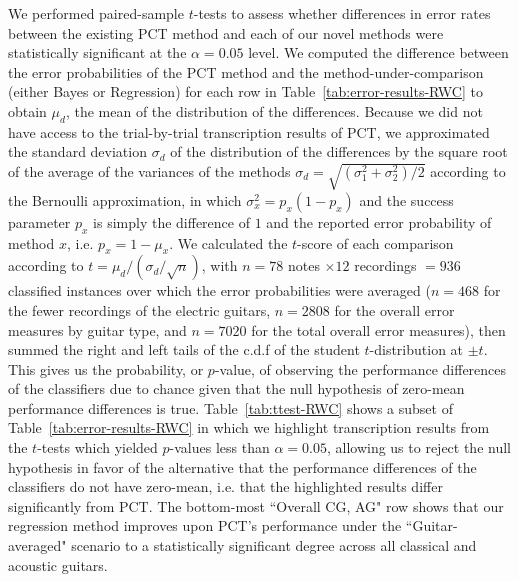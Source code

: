 \documentclass[12pt]{cmuthesis}
\begin{document}
We performed paired-sample $t$-tests to assess whether differences in error rates between the existing PCT method and each of our novel methods were statistically significant at the $\alpha = 0.05$ level. We computed the difference between the error probabilities of the PCT method and the method-under-comparison (either Bayes or Regression) for each row in Table~\ref{tab:error-results-RWC} to obtain $\mu_d$, the mean of the distribution of the differences. Because we did not have access to the trial-by-trial transcription results of PCT, we approximated the standard deviation $\sigma_d$ of the distribution of the differences by the square root of the average of the variances of the methods $\sigma_d = \sqrt{(\sigma^2_1+\sigma^2_2)/2}$ according to the Bernoulli approximation, in which $\sigma_x^2 = p_x(1-p_x)$ and the success parameter $p_x$ is simply the difference of $1$ and the reported error probability of method $x$, i.e. $p_x = 1-\mu_x$. We calculated the $t$-score of each comparison according to $t = \mu_d/(\sigma_d/\sqrt{n})$, with $n= 78$ notes $\times 12$ recordings $=936$ classified instances over which the error probabilities were averaged ($n=468$ for the fewer recordings of the electric guitars, $n=2808$ for the overall error measures by guitar type, and $n=7020$ for the total overall error measures), then summed the right and left tails of the c.d.f of the student $t$-distribution at $\pm t$. This gives us the probability, or $p$-value, of observing the performance differences of the classifiers due to chance given that the null hypothesis of zero-mean performance differences is true. Table~\ref{tab:ttest-RWC} shows a subset of Table~\ref{tab:error-results-RWC} in which we highlight transcription results from the $t$-tests which yielded $p$-values less than $\alpha = 0.05$, allowing us to reject the null hypothesis in favor of the alternative that the performance differences of the classifiers do not have zero-mean, i.e. that the highlighted results differ significantly from PCT. The bottom-most ``Overall CG, AG" row shows that our regression method improves upon PCT's performance under the ``Guitar-averaged" scenario to a statistically significant degree across all classical and acoustic guitars.
\end{document}
